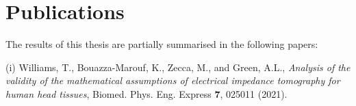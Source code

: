 
\chapter*{Publications}

The results of this thesis are partially summarised in the following papers: %

\vspace{0.2cm}
\hspace{-1.7cm}(i) Williams, T.,  Bouazza-Marouf, K., Zecca, M., and Green, A.L., \emph{Analysis of the validity of the mathematical assumptions of electrical impedance tomography for human head tissues}, Biomed. Phys. Eng. Express \textbf{7}, 025011 (2021).


